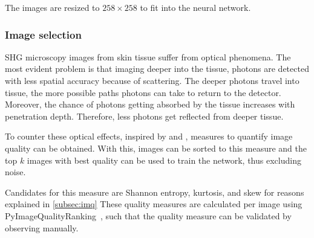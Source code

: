 The images are resized to $258\times258$ to fit into the neural network.

\subsubsection{Image selection}\label{subsec:image-selection}
SHG microscopy images from skin tissue suffer from optical phenomena.
The most evident problem is that imaging deeper into the tissue, photons are detected with less spatial accuracy because of scattering.
The deeper photons travel into tissue, the more possible paths photons can take to return to the detector.
Moreover, the chance of photons getting absorbed by the tissue increases with penetration depth.
Therefore, less photons get reflected from deeper tissue.

To counter these optical effects, inspired by \citeauthor{Koho2016}  and \citeauthor{Blokker2022} , measures to quantify image quality can be obtained.
With this, images can be sorted to this measure and the top $k$ images with best quality can be used to train the network, thus excluding noise.

Candidates for this measure are Shannon entropy, kurtosis, and skew for reasons explained in \ref{subsec:imq}
These quality measures are calculated per image using PyImageQualityRanking~, such that the quality measure can be validated by observing manually.




